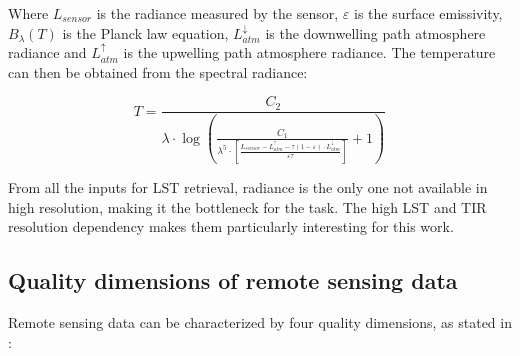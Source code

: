         Where $L_{sensor}$ is the radiance measured by the sensor, $\varepsilon$ is the surface emissivity, $B_{\lambda}(T)$ is the Planck law equation, $L_{atm}^{\downarrow}$ is the downwelling path atmosphere radiance and $L_{atm}^{\uparrow}$ is the upwelling path atmosphere radiance. 
        The temperature can then be obtained from the spectral radiance:

        \begin{equation}
            T = \frac{C_2}{\lambda \cdot \log\left(\frac{C_1}{\lambda^5 \cdot \left[ \frac{L_{sensor} - L_{atm}^{\uparrow}- \tau (1 - \varepsilon) \cdot L_{atm}^{\downarrow}}{\varepsilon \tau}  \right]}+1\right)}
        \end{equation}

        From all the inputs for LST retrieval, radiance is the only one not available in high resolution, making it the bottleneck for the task. The high LST and TIR resolution dependency makes them particularly interesting for this work.
        
       

    \subsection{Quality dimensions of remote sensing data}

    Remote sensing data can be characterized by four quality dimensions, as stated in \cite{HORNING20082986}:

